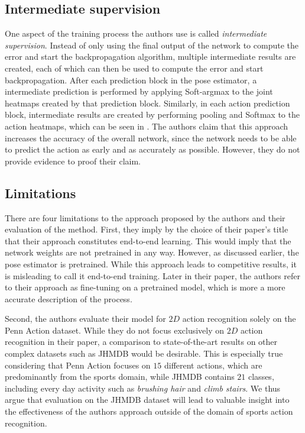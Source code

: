 \subsection{Intermediate supervision}
\label{sec:luvizon_intermediate_supervision}
One aspect of the training process the authors use is called \textit{intermediate supervision}.
Instead of only using the final output of the network to compute the error and start the backpropagation algorithm, multiple intermediate results are created, each of which can then be used to compute the error and start backpropagation.
After each prediction block in the pose estimator, a intermediate prediction is performed by applying Soft-argmax to the joint heatmaps created by that prediction block.
Similarly, in each action prediction block, intermediate results are created by performing pooling and Softmax to the action heatmaps, which can be seen in .
The authors claim that this approach increases the accuracy of the overall network, since the network needs to be able to predict the action as early and as accurately as possible.
However, they do not provide evidence to proof their claim.  

\subsection{Limitations}
\label{sec:deephar_limitations}
There are four limitations to the approach proposed by the authors and their evaluation of the method.
First, they imply by the choice of their paper's title that their approach constitutes end-to-end learning.
This would imply that the network weights are not pretrained in any way.
However, as discussed earlier, the pose estimator is pretrained.
While this approach leads to competitive results, it is misleading to call it end-to-end training.
Later in their paper, the authors refer to their approach as fine-tuning on a pretrained model, which is more a more accurate description of the process. 

Second, the authors evaluate their model for $2D$ action recognition solely on the Penn Action dataset.
While they do not focus exclusively on $2D$ action recognition in their paper, a comparison to state-of-the-art results on other complex datasets such as JHMDB would be desirable.
This is especially true considering that Penn Action focuses on $15$ different actions, which are predominantly from the sports domain, while JHMDB contains $21$ classes, including every day activity such as \textit{brushing hair} and \textit{climb stairs}.
We thus argue that evaluation on the JHMDB dataset will lead to valuable insight into the effectiveness of the authors approach outside of the domain of sports action recognition. 

